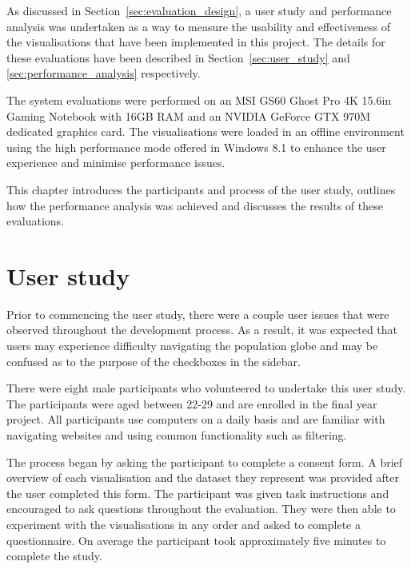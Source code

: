 
As discussed in Section~\ref{sec:evaluation_design}, a user study and performance analysis was undertaken as a way to measure the usability and effectiveness of the visualisations that have been implemented in this project. The details for these evaluations have been described in Section~\ref{sec:user_study} and \ref{sec:performance_analysis} respectively.

The system evaluations were performed on an MSI GS60 Ghost Pro 4K 15.6in Gaming Notebook with 16GB RAM and an NVIDIA GeForce GTX 970M dedicated graphics card. The visualisations were loaded in an offline environment using the high performance mode offered in Windows 8.1 to enhance the user experience and minimise performance issues.

This chapter introduces the participants and process of the user study, outlines how the performance analysis was achieved and discusses the results of these evaluations.

\section{User study} {
\label{sec:user_study}

	Prior to commencing the user study, there were a couple user issues that were observed throughout the development process. As a result, it was expected that users may experience difficulty navigating the population globe and may be confused as to the purpose of the checkboxes in the sidebar.

	There were eight male participants who volunteered to undertake this user study. The participants were aged between 22-29 and are enrolled in the final year project. All participants use computers on a daily basis and are familiar with navigating websites and using common functionality such as filtering.

	The process began by asking the participant to complete a consent form. A brief overview of each visualisation and the dataset they represent was provided after the user completed this form. The participant was given task instructions and encouraged to ask questions throughout the evaluation. They were then able to experiment with the visualisations in any order and asked to complete a questionnaire. On average the participant took approximately five minutes to complete the study.

}

